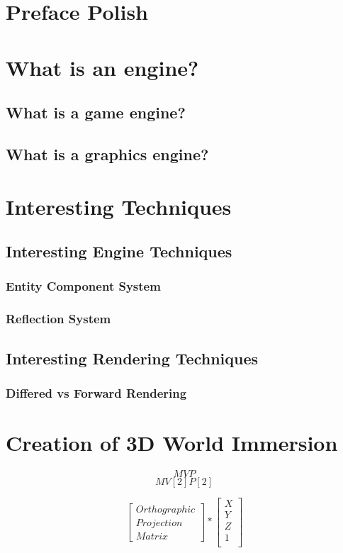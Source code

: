 \section{Preface Polish}  %
\newpage
\section{What is an engine?}
\subsection{What is a game engine?}
\subsection{What is a graphics engine?}
\newpage
\section{Interesting Techniques} %
\subsection{Interesting Engine Techniques}
\subsubsection{Entity Component System}
\label{sec:theory_ecs}
\subsubsection{Reflection System}
\label{sec:refl}

\newpage
\subsection{Interesting Rendering Techniques}
\subsubsection{Differed vs Forward Rendering}

\newpage
\section{Creation of 3D World Immersion}
\[MVP\]
\[MV[2]P[2]\]

\[
\begin{bmatrix}
Orthographic\\
Projection \\
Matrix
\end{bmatrix} 
*
\begin{bmatrix}
X\\
Y\\
Z\\
1\\
\end{bmatrix} 
\]

